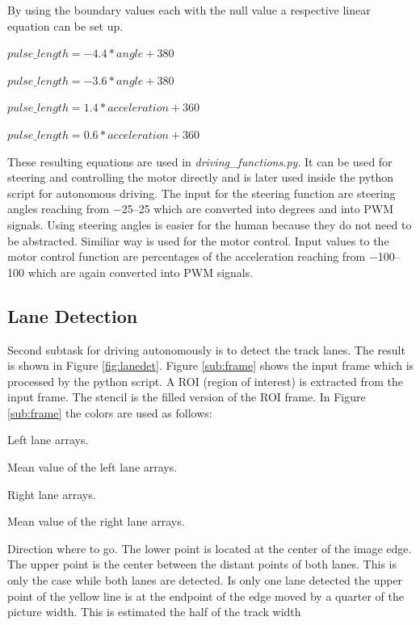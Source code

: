 \documentclass[conference]{IEEEtran}
\begin{document}
By using the boundary values each with the null value a respective linear equation can be set up.
\begin{description}
\setlength\itemsep{.25em}
\item[Left] $ pulse\_length = -4.4 * angle + 380 $
\item[Right] $ pulse\_length = -3.6 * angle + 380 $
\item[Forwards] $ pulse\_length = 1.4 * acceleration + 360 $
\item[Backwards] $ pulse\_length = 0.6 * acceleration + 360 $
\end{description}
These resulting equations are used in \textit{driving\_functions.py}.
It can be used for steering and controlling the motor directly and is later used inside the python script for autonomous driving.
The input for the steering function are steering angles reaching from \numrange{-25}{25} which are converted into degrees and into PWM signals.
Using steering angles is easier for the human because they do not need to be abstracted.
Similiar way is used for the motor control.
Input values to the motor control function are percentages of the acceleration reaching from \numrange{-100}{100} which are again converted into PWM signals.

\subsection{Lane Detection}

Second subtask for driving autonomously is to detect the track lanes.
The result is shown in Figure \ref{fig:lanedet}.
Figure \ref{sub:frame} shows the input frame which is processed by the python script.
A ROI (region of interest) is extracted from the input frame.
The stencil is the filled version of the ROI frame.
In Figure \ref{sub:frame} the colors are used as follows:
\begin{description}
	\setlength\itemsep{.25em}
	\item[Green] Left lane arrays.
	\item[Red] Mean value of the left lane arrays.
	\item[Blue] Right lane arrays.
	\item[Pink] Mean value of the right lane arrays.
	\item[Yellow] Direction where to go. The lower point is located at the center of the image edge. The upper point is the center between the distant points of both lanes. This is only the case while both lanes are detected. Is only one lane detected the upper point of the yellow line is at the endpoint of the edge moved by a quarter of the picture width. This is estimated the half of the track width
\end{description}
\end{document}
